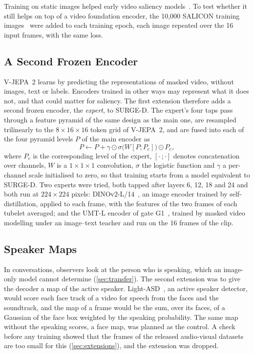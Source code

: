 Training on static images helped early video saliency
models~\cite{wang2018revisiting}. To test whether it still helps on top of a
video foundation encoder, the 10,000 SALICON training
images~\cite{jiang2015salicon} were added to each training epoch, each image
repeated over the 16 input frames, with the same loss.

\subsection{A Second Frozen Encoder}\label{sec:second-encoder}

\acrshort{V-JEPA}~2 learns by predicting the representations of masked video,
without images, text or labels. Encoders trained in other ways may represent
what it does not, and that could matter for saliency. The first extension
therefore adds a second frozen encoder, the \emph{expert}, to SURGE-D. The
expert's four taps pass through a feature pyramid of the same design as the
main one, are resampled trilinearly to the $8\times16\times16$ token grid of
\acrshort{V-JEPA}~2, and are fused into each of the four pyramid levels $P$ of
the main encoder as
\begin{equation}
  P \leftarrow P + \gamma\odot\sigma\big(W[P;P_e]\big)\odot P_e,
  \label{eq:expert}
\end{equation}
where $P_e$ is the corresponding level of the expert, $[\cdot\,;\cdot]$ denotes
concatenation over channels, $W$ is a $1\times1\times1$ convolution, $\sigma$
the logistic function and $\gamma$ a per-channel scale initialised to zero, so
that training starts from a model equivalent to SURGE-D. Two experts were
tried, both tapped after layers 6, 12, 18 and 24 and both run at
$224\times224$ pixels: DINOv2-L/14~\cite{oquab2024dinov2}, an image encoder
trained by self-distillation, applied to each frame, with the features of the
two frames of each tubelet averaged; and the \acrshort{UMT}-L encoder of gate
G1~\cite{li2023unmasked}, trained by masked video modelling under an
image--text teacher and run on the 16 frames of the clip.

\subsection{Speaker Maps}\label{sec:speaker-maps}

In conversations, observers look at the person who is speaking, which an
image-only model cannot determine (\cref{sec:transfer}). The second extension
was to give the decoder a map of the active speaker. Light-ASD~\cite{liao2023light},
an active speaker detector, would score each face track of a video for speech
from the faces and the soundtrack, and the map of a frame would be the sum,
over its faces, of a Gaussian of the face box weighted by the speaking
probability. The same map without the speaking scores, a face map, was planned
as the control. A check before any training showed that the frames of the
released audio-visual datasets are too small for this (\cref{sec:extensions}),
and the extension was dropped.

